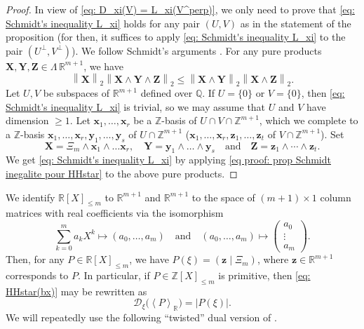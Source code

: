 \documentclass[JEP,XML,SOM,Unicode,NoFloatCountersInSection,published]{cedram}
\newcommand\sbw[2]{{{\mathsf{\Lambda}}^{{\!\scriptstyle#1}}{#2}}}
\newcommand\bx{\boldsymbol{x}}
\newcommand\by{\boldsymbol{y}}
\newcommand\bz{\boldsymbol{z}}
\newcommand\bX{\boldsymbol{X}}
\newcommand\bY{\boldsymbol{Y}}
\newcommand\bZZ{\boldsymbol{Z}}
\newcommand\bQ{\mathbb{Q}}
\newcommand\bR{\mathbb{R}}
\newcommand\bZ{\mathbb{Z}}
\newcommand\HHstar{\mathcal{D}_{\xi}}
\newcommand{\norm}[1]{\left\|#1 \right\|_2}
\newcommand{\psc}[2]{\left(#1 \mid #2\right)}
\newcommand{\Vect}[2][]{\left\la #2\right\ra_{#1}}
\let\la\langle
\let\ra\rangle
\newcommand\AND{\quad\text{and}\quad}
\theoremstyle{definition}
\theoremstyle{plain}
\begin{document}
\begin{proof}
In view of \eqref{eq: D_xi(V) = L_xi(V^perp)}, we only need to prove that \eqref{eq: Schmidt's inequality L_xi} holds for any pair $(U,V)$ as in the statement of the proposition (for then, it suffices to apply \eqref{eq: Schmidt's inequality L_xi} to the pair $(U^\perp,V^\perp)$). We follow Schmidt's arguments \cite[Ch.\,I, Lem.\,8A]{Schmidt}. For any pure products $\bX, \bY, \bZZ \in \sbw{\,}{\bR^{m+1}}$, we have
\begin{equation}
\label{eq proof: prop Schmidt inegalite pour HHstar}
\norm{\bX} \norm{\bX\wedge \bY \wedge \bZZ} \leq \norm{\bX\wedge \bY} \norm{\bX\wedge \bZZ}.
\end{equation}
Let $U, V$ be subspaces of $\bR^{m+1}$ defined over $\bQ$. If $U=\{0\}$ or $V = \{0\}$, then \eqref{eq: Schmidt's inequality L_xi} is trivial, so we may assume that $U$ and $V$ have dimension $\geq 1$. Let $\bx_1,\dots,\bx_r$ be a $\bZ$-basis of $U\cap V \cap \bZ^{m+1}$, which we complete to a $\bZ$-basis $\bx_1,\dots,\bx_r,\by_1,\dots,\by_s$ of $U\cap\bZ^{m+1}$ (\resp $\bx_1,\dots,\bx_r,\bz_1,\dots,\bz_t$ of $V\cap\bZ^{m+1}$). Set
\begin{equation*}
\bX = \Xi_m\wedge \bx_1 \wedge \dots \bx_r, \quad \bY = \by_1\wedge \dots \wedge \by_s \AND \bZZ = \bz_1 \wedge \cdots \wedge\bz_t.
\end{equation*}
We get \eqref{eq: Schmidt's inequality L_xi} by applying \eqref{eq proof: prop Schmidt inegalite pour HHstar} to the above pure products.
\end{proof}

We identify $\bR[X]_{\leq m}$ to $\bR^{m+1}$ and $\bR^{m+1}$ to the space of $(m+1)\times 1$ column matrices with real coefficients via the isomorphism
\begin{equation}
\label{eq: identification poly avec points de R^m}
\sum_{k=0}^{m} a_k X^k \longmapsto (a_0,\dots,a_{m}) \AND
(a_0,\dots,a_{m})\mapsto
\begin{pmatrix}
a_0 \\
\vdots \\
a_{m}
\end{pmatrix}.
\end{equation}
Then, for any $P\in\bR[X]_{\leq m}$, we have $P(\xi) = \psc{\bz}{\Xi_m}$, where $\bz\in\bR^{m+1}$ corresponds to $P$. In particular, if $P\in\bZ[X]_{\leq m}$ is primitive, then \eqref{eq: HHstar(bx)} may be rewritten as
\begin{equation}
\label{eq: HHstar(P)}
\HHstar\big(\Vect[\bR]{P}\big) = |P(\xi)|.
\end{equation}
We will repeatedly use the following ``twisted'' dual version of \cite[Lem.\,2.1]{poels2022simultaneous}.
\end{document}
